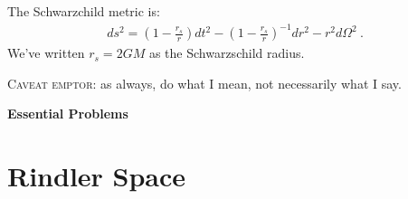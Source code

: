 \documentclass[12pt]{article}
\numberwithin{equation}{section}    %
\begin{document}
\vspace{2em}

The Schwarzchild metric is:
\begin{align}
	ds^2 = \left(1-\frac{r_s}{r}\right)dt^2 
	- \left(1-\frac{r_s}{r}\right)^{-1}dr^2
	- r^2 d\Omega^2 \ .
\end{align}
We've written $r_s = 2GM$ as the Schwarzschild radius.


\textsc{Caveat emptor}: as always, do what I mean, not necessarily what I say.


\vspace{2em}
{\Large\textbf{\textsf{Essential Problems}}}

\section{Rindler Space}

\end{document}
